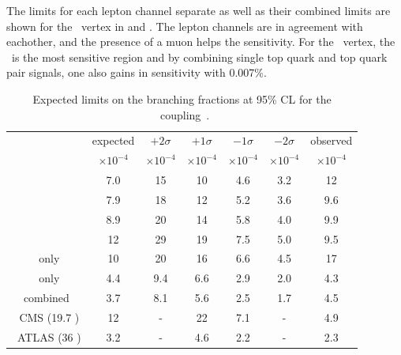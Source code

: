 The limits for each lepton channel separate as well as their combined limits are shown for the \Zct\ vertex in   and . The lepton channels are in agreement with eachother, and the presence of a muon helps the sensitivity. For the \Zct\ vertex, the \TTSR\ is the most sensitive region  and by combining single top quark and top quark pair signals, one also gains in sensitivity with 0.007\%. 

\begin{table}[htbp]
	\centering
	\caption{Expected limits on the branching fractions at 95\% CL for the \Zct\ coupling~\cite{Sirunyan:2017kkr,ATLAS-CONF-2017-070}.}
	\begin{tabular}{ccccccc}
		\toprule
		& expected & $+2\sigma$ & $+1\sigma$ & $-1\sigma$ & $-2\sigma$ & observed \\ 
			& $\times 10^{-4}$ & $\times 10^{-4}$ & $\times 10^{-4}$ & $\times 10^{-4}$ & $\times 10^{-4}$ & $\times 10^{-4}$ \\
		
		\midrule
		\mumumu\ & 7.0  & 15  & 10  & 4.6  & 3.2  & 12  \\ 
		
		\emumu\ & 7.9  & 18  & 12  & 5.2  & 3.6  & 9.6  \\ 
		
		\eemu\ & 8.9  & 20  & 14  & 5.8  & 4.0  & 9.9  \\ 
		
		\eee\ & 12  & 29  & 19  & 7.5  & 5.0  & 9.5  \B\\ 
		\hdashline
		\STSR\ only & 10  & 20  & 16  & 6.6  & 4.5  & 17  \T \\ 
		
		\TTSR\ only & 4.4  & 9.4  & 6.6  & 2.9  & 2.0  & 4.3  \B \\ 
		\hdashline 
		combined & 3.7  & 8.1  & 5.6  & 2.5  & 1.7  & 4.5  \T\B\\ 
		\hdashline
		8 \TeV\ CMS (19.7 \fbinv)    & 12  & -  &22  & 7.1  & -  & 4.9  \T\B\\
		\hdashline
		13 \TeV\ ATLAS (36 \fbinv)    & 3.2  & -  &4.6  & 2.2 & -  & 2.3  \T\\
		\hline
	\end{tabular} 
	\label{tab:ResultsTZC}
\end{table}
